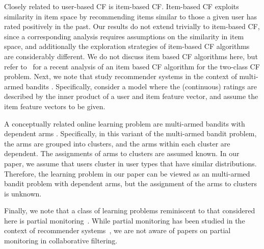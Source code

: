 \documentclass{article}
\begin{document}
%
Closely related to user-based CF is item-based CF.  
Item-based CF exploits similarity in item space by %
recommending items similar to those a given user has rated positively in the past. 
Our results do not extend trivially to item-based CF, since a corresponding analysis requires assumptions on the similarity in item space, and additionally the exploration strategies of item-based CF algorithms are considerably different. 
We do not discuss item based CF algorithms %
here, 
but refer to~\cite{bresler_regret_2015} for a recent analysis of an item based CF algorithm for the two-class CF problem. 
%
Next, we note that \citet{deshpande_linear_2012} study recommender systems in the context of multi-armed bandits \cite{bubeck_regret_2012}. 
Specifically, \citet{deshpande_linear_2012} consider a model where the (continuous) ratings are described by the inner product of a user and item feature vector, and assume the item feature vectors to be given. 

A conceptually related online learning problem are multi-armed bandits with dependent arms \cite{pandey_multi-armed_2007}. 
Specifically, in this variant of the multi-armed bandit problem, the arms are grouped into clusters, and the arms within each cluster are dependent. 
The assignments of arms to clusters are assumed known. 
In our paper, we assume that users cluster in user types that have similar distributions. 
Therefore, the learning problem in our paper can be viewed as an multi-armed bandit problem with dependent arms, but the assignment of the arms to clusters is unknown. 

Finally, we note that a class of learning problems reminiscent to that considered here is partial monitoring~\cite{bartok_partial_2014}. 
While partial monitoring has been studied in the context of recommender systems~\cite{kveton_cascading_2015}, we are not aware of papers on partial monitoring in collaborative filtering. 
\end{document}
